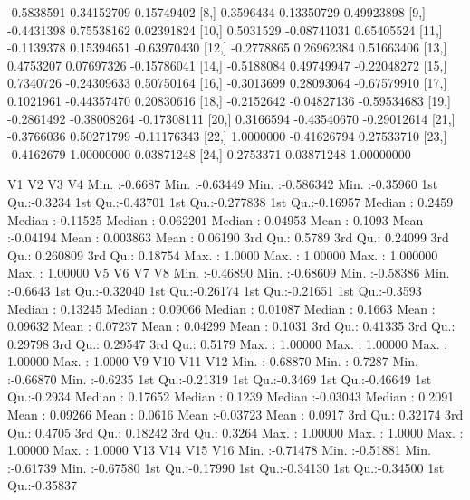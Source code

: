 \documentclass[a4paper, 12pt]{article}
\begin{document}
\begin{table}[H]
\begin{Schunk}
\begin{Soutput}
 [7,] -0.5838591  0.34152709  0.15749402
 [8,]  0.3596434  0.13350729  0.49923898
 [9,] -0.4431398  0.75538162  0.02391824
[10,]  0.5031529 -0.08741031  0.65405524
[11,] -0.1139378  0.15394651 -0.63970430
[12,] -0.2778865  0.26962384  0.51663406
[13,]  0.4753207  0.07697326 -0.15786041
[14,] -0.5188084  0.49749947 -0.22048272
[15,]  0.7340726 -0.24309633  0.50750164
[16,] -0.3013699  0.28093064 -0.67579910
[17,]  0.1021961 -0.44357470  0.20830616
[18,] -0.2152642 -0.04827136 -0.59534683
[19,] -0.2861492 -0.38008264 -0.17308111
[20,]  0.3166594 -0.43540670 -0.29012614
[21,] -0.3766036  0.50271799 -0.11176343
[22,]  1.0000000 -0.41626794  0.27533710
[23,] -0.4162679  1.00000000  0.03871248
[24,]  0.2753371  0.03871248  1.00000000
\end{Soutput}
\begin{Soutput}
       V1                V2                 V3                  V4          
 Min.   :-0.6687   Min.   :-0.63449   Min.   :-0.586342   Min.   :-0.35960  
 1st Qu.:-0.3234   1st Qu.:-0.43701   1st Qu.:-0.277838   1st Qu.:-0.16957  
 Median : 0.2459   Median :-0.11525   Median :-0.062201   Median : 0.04953  
 Mean   : 0.1093   Mean   :-0.04194   Mean   : 0.003863   Mean   : 0.06190  
 3rd Qu.: 0.5789   3rd Qu.: 0.24099   3rd Qu.: 0.260809   3rd Qu.: 0.18754  
 Max.   : 1.0000   Max.   : 1.00000   Max.   : 1.000000   Max.   : 1.00000  
       V5                 V6                 V7                 V8         
 Min.   :-0.46890   Min.   :-0.68609   Min.   :-0.58386   Min.   :-0.6643  
 1st Qu.:-0.32040   1st Qu.:-0.26174   1st Qu.:-0.21651   1st Qu.:-0.3593  
 Median : 0.13245   Median : 0.09066   Median : 0.01087   Median : 0.1663  
 Mean   : 0.09632   Mean   : 0.07237   Mean   : 0.04299   Mean   : 0.1031  
 3rd Qu.: 0.41335   3rd Qu.: 0.29798   3rd Qu.: 0.29547   3rd Qu.: 0.5179  
 Max.   : 1.00000   Max.   : 1.00000   Max.   : 1.00000   Max.   : 1.0000  
       V9                V10               V11                V12         
 Min.   :-0.68870   Min.   :-0.7287   Min.   :-0.66870   Min.   :-0.6235  
 1st Qu.:-0.21319   1st Qu.:-0.3469   1st Qu.:-0.46649   1st Qu.:-0.2934  
 Median : 0.17652   Median : 0.1239   Median :-0.03043   Median : 0.2091  
 Mean   : 0.09266   Mean   : 0.0616   Mean   :-0.03723   Mean   : 0.0917  
 3rd Qu.: 0.32174   3rd Qu.: 0.4705   3rd Qu.: 0.18242   3rd Qu.: 0.3264  
 Max.   : 1.00000   Max.   : 1.0000   Max.   : 1.00000   Max.   : 1.0000  
      V13                V14                V15                V16          
 Min.   :-0.71478   Min.   :-0.51881   Min.   :-0.61739   Min.   :-0.67580  
 1st Qu.:-0.17990   1st Qu.:-0.34130   1st Qu.:-0.34500   1st Qu.:-0.35837  

\end{Soutput}
\end{Schunk}
\end{table}
\end{document}
